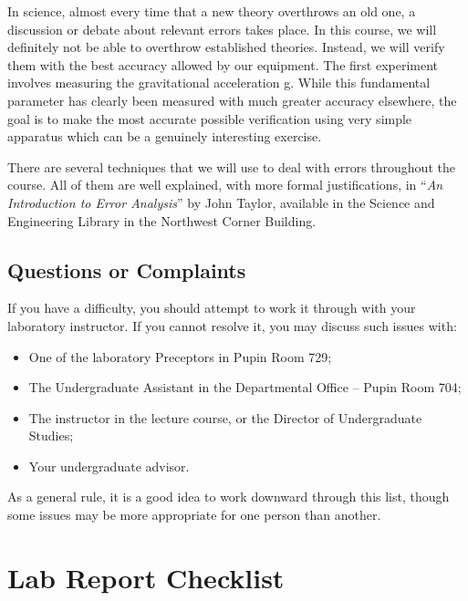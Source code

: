 In science, almost every time that a new theory overthrows an old one, a discussion or debate about relevant errors takes place. In this course, we will definitely not be able to overthrow established theories. Instead, we will verify them with the best accuracy allowed by our equipment. The first experiment involves measuring the gravitational acceleration g. While this fundamental parameter has clearly been measured with much greater accuracy elsewhere, the goal is to make the most accurate possible verification using very simple apparatus which can be a genuinely interesting exercise.\myskip

There are several techniques that we will use to deal with errors throughout the course. All of them are well explained, with more formal justifications, in ``\emph{An Introduction to Error Analysis}'' by John Taylor, available in the Science and Engineering Library in the Northwest Corner Building.

\subsection{Questions or Complaints}

If you have a difficulty, you should attempt to work it through with your laboratory instructor.  If you cannot resolve it, you may discuss such issues with:

\begin{itemize}
    \item One of the laboratory Preceptors in Pupin Room 729;

    \item The Undergraduate Assistant in the Departmental Office -- Pupin Room 704;

    \item The instructor in the lecture course, or the Director of Undergraduate Studies;

    \item Your undergraduate advisor.
\end{itemize}

As a general rule, it is a good idea to work downward through this list, though some issues may be more appropriate for one person than another.

\section{Lab Report Checklist}

